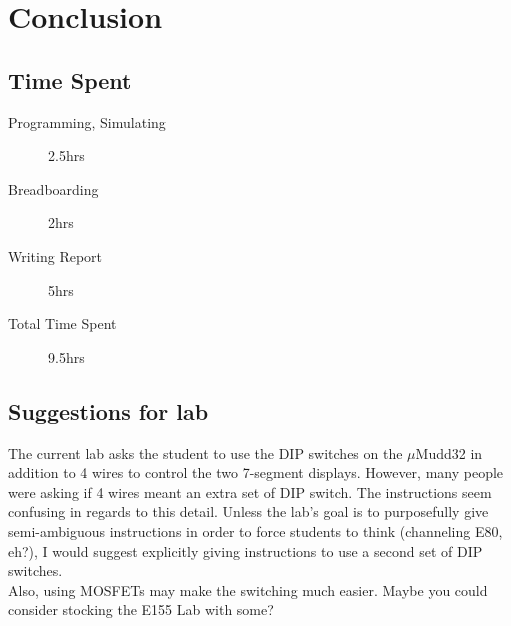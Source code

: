 \documentclass[11pt]{article}
\begin{document}
\section{Conclusion}

\subsection{Time Spent}

\begin{description}
	\item[Programming, Simulating] 2.5hrs
	\item[Breadboarding] 2hrs
	\item[Writing Report] 5hrs
	\item[Total Time Spent] 9.5hrs
\end{description}

\subsection{Suggestions for lab}

The current lab asks the student to use the DIP switches on the $\mu$Mudd32 in addition to 4 wires to control the two 7-segment displays. However, many people were asking if 4 wires meant an extra set of DIP switch. The instructions seem confusing in regards to this detail. Unless the lab's goal is to purposefully give semi-ambiguous instructions in order to force students to think (channeling E80, eh?), I would suggest explicitly giving instructions to use a second set of DIP switches. \\

Also, using MOSFETs may make the switching much easier. Maybe you could consider stocking the E155 Lab with some?
\end{document}

